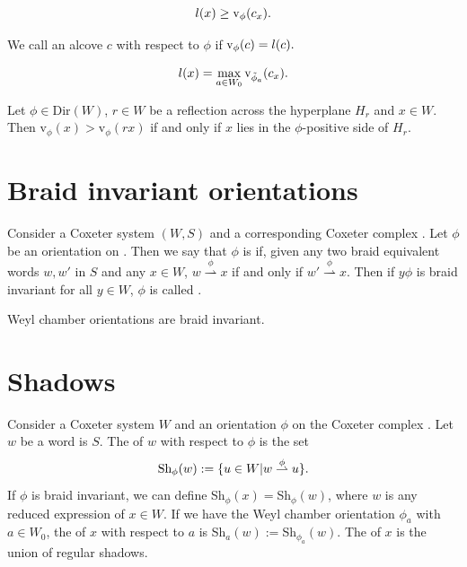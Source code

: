 \documentclass[11pt]{article}
\begin{document}
\begin{lemma}
    \[l(x)\geq\textnormal{v}_\phi(c_x).\]
\end{lemma}

\begin{definition}
    We call an alcove $c$  with respect to $\phi$ if $\textnormal{v}_\phi(c)=l(c).$
\end{definition}

\begin{lemma}
    \[l(x)=\max_{a\in W_0}\textnormal{v}_{\tilde{\phi}_a}(c_x).\]
\end{lemma}

\begin{lemma}
    Let $\phi\in$Dir$(W)$, $r\in W$ be a reflection across the hyperplane $H_r$ and $x\in W$. Then v$_\phi(x)>$v$_\phi(rx)$ if and only if $x$ lies in the $\phi$-positive side of $H_r$. 
\end{lemma}






\section{Braid invariant orientations}

\begin{definition}
    Consider a Coxeter system $(W,S)$ and a corresponding Coxeter complex \sg. Let $\phi$ be an orientation on \sg. Then we say that $\phi$ is  if, given any two braid equivalent words $w,w'$ in $S$ and any $x\in W$, $w\stackrel{\phi}{\rightharpoonup} x$ if and only if $w'\stackrel{\phi}{\rightharpoonup} x$. Then if $y\phi$ is braid invariant for all $y\in W$, $\phi$ is called . 
\end{definition}


\begin{proposition}
    Weyl chamber orientations are braid invariant.
\end{proposition}

\section{Shadows}
\begin{definition}
    Consider a Coxeter system $W$ and an orientation $\phi$ on the Coxeter complex \sg\W. Let $w$ be a word is $S$. The  of $w$ with respect to $\phi$ is the set 
    \[\textnormal{Sh}_\phi(w):=\{u\in W|w\stackrel{\phi}{\rightharpoonup} u\}.\]
    If $\phi$ is braid invariant, we can define Sh$_\phi(x)=$Sh$_\phi(w)$, where $w$ is any reduced expression of $x\in W$. If we have the Weyl chamber orientation $\phi_a$ with $a\in W_0$, the  of $x$ with respect to $a$ is Sh$_a(w):=$Sh$_{\phi_a}(w)$. The  of $x$ is the union of regular shadows. 
\end{definition}
\end{document}
